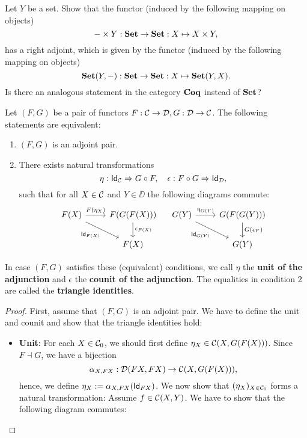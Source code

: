 \begin{exer}\label{exer:adjunction_homtensor_currying} Let $Y$ be a set. Show that the functor (induced by the following mapping on objects)
\[
- \times Y : \SET\to \SET: X\mapsto X\times Y,
\]
has a right adjoint, which is given by the functor (induced by the following mapping on objects)
\[
\CHom{\SET}{Y}{-} : \SET\to\SET : X\mapsto \CHom{\SET}{Y}{X}.
\]
Is there an analogous statement in the category $\COQ$ instead of $\SET$?
\end{exer}

\begin{thm} Let $(F,G)$ be a pair of functors $F : \CC\to\DD, G: \DD\to\CC$. The following statements are equivalent:
\begin{enumerate}
\item $(F,G)$ is an adjoint pair.
\item There exists natural transformations 
\[
\NatTrans{\eta}{\Id[\CC]}{\co{F}{G}}, \quad \NatTrans{\epsilon}{\co{G}{F}}{\Id[\DD]},
\]
such that for all $X\in\CC$ and $Y\in\DD$ the following diagrams commute:
\[
\begin{tikzcd}
F(X) \arrow[r,"{F(\eta_X)}"] \arrow[rd,swap, "{\Id[F(X)]}"] & F(G(F(X))) \arrow[d, "{\epsilon_{F(X)}}"] \\
& F(X)
\end{tikzcd} \quad 
\begin{tikzcd}
G(Y) \arrow[r,"{\eta_{G(Y)}}"] \arrow[rd,swap, "{\Id[G(Y)]}"] & G(F(G(Y))) \arrow[d, "{G(\epsilon_{Y})}"] \\
& G(Y)
\end{tikzcd}
\]
\end{enumerate}
In case $(F,G)$ satisfies these (equivalent) conditions, we call $\eta$ the \textbf{unit of the adjunction} and $\epsilon$ the \textbf{counit of the adjunction}. The equalities in condition $2$ are called the \textbf{triangle identities}.
\begin{proof}
First, assume that $(F,G)$ is an adjoint pair. We have to define the unit and counit and show that the triangle identities hold:
\begin{itemize}
\item \textbf{Unit}: For each $X\in\Ob{\CC}$, we should first define $\eta_X \in \CHom{\CC}{X}{G(F(X))}$. Since $F \dashv G$, we have a bijection
\[
\alpha_{X,FX} : \CHom{\DD}{FX}{FX} \to \CHom{\CC}{X}{G(F(X))},
\]
hence, we define $\eta_X := \alpha_{X,FX}(\Id[FX])$. We now show that $(\eta_X)_{X\in\Ob{\CC}}$ forms a natural transformation: Assume $f\in\CHom{\CC}{X}{Y}$. We have to show that the following diagram commutes:

\end{itemize}
\end{proof}
\end{thm}
